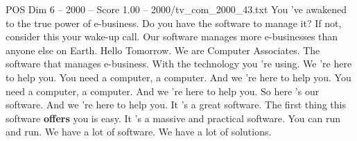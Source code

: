 \begin{textsample}{POS Dim 6 – 2000 – Score 1.00 – 2000/tv\_com\_2000\_43.txt}  \label{ex:f6_pos_082}
You 've awakened to the true power of e-business.
Do you have the software to manage it?
If not, consider this your wake-up call.
Our software manages more e-businesses than anyone else on Earth.
Hello Tomorrow.
We are Computer Associates.
The software that manages e-business.
With the technology you 're using.
We 're here to help you.
You need a computer, a computer.
And we 're here to help you.
You need a computer, a computer.
And we 're here to help you.
So here 's our software.
And we 're here to help you.
It 's a great software.
The first thing this software \textbf{offers} you is easy.
It 's a massive and practical software.
You can run and run.
We have a lot of software.
We have a lot of solutions.

\end{textsample}
